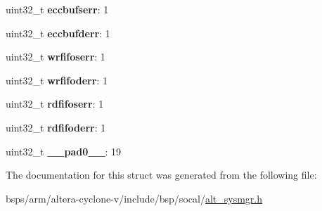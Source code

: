 \begin{DoxyCompactItemize}
uint32\+\_\+t {\bfseries eccbufserr}\+: 1
\item 
\mbox{\label{structALT__SYSMGR__ECC__NAND__s_af49637fe15047bf1ba9432f7160f601e}} 
uint32\+\_\+t {\bfseries eccbufderr}\+: 1
\item 
\mbox{\label{structALT__SYSMGR__ECC__NAND__s_aa1fc99a43726f9698b41c8a53f19297b}} 
uint32\+\_\+t {\bfseries wrfifoserr}\+: 1
\item 
\mbox{\label{structALT__SYSMGR__ECC__NAND__s_a13c59c97df0a17b82511bbfce3342915}} 
uint32\+\_\+t {\bfseries wrfifoderr}\+: 1
\item 
\mbox{\label{structALT__SYSMGR__ECC__NAND__s_a924828e0eec957712032e00631bc7d95}} 
uint32\+\_\+t {\bfseries rdfifoserr}\+: 1
\item 
\mbox{\label{structALT__SYSMGR__ECC__NAND__s_ad6c0c41c80fd70c8fb67065ea8b2666e}} 
uint32\+\_\+t {\bfseries rdfifoderr}\+: 1
\item 
\mbox{\label{structALT__SYSMGR__ECC__NAND__s_a8462a826477a633badebad2abfbb3058}} 
uint32\+\_\+t {\bfseries \+\_\+\+\_\+pad0\+\_\+\+\_\+}\+: 19
\end{DoxyCompactItemize}


The documentation for this struct was generated from the following file\+:\begin{DoxyCompactItemize}
\item 
bsps/arm/altera-\/cyclone-\/v/include/bsp/socal/\mbox{\hyperlink{alt__sysmgr_8h}{alt\+\_\+sysmgr.\+h}}\end{DoxyCompactItemize}
